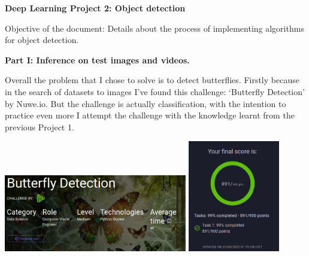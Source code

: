 \documentclass{cpsc202}
\begin{document}
    \centerline{\Large\textbf{Deep Learning Project 2: Object detection}}

    Objective of the document: Details about the process of implementing algorithms for object detection.

    \large\textbf{Part I: Inference on test images and videos.}

    Overall the problem that I chose to solve is to detect butterflies.
    Firstly because in the search of datasets to images I've found this challenge: `Butterfly Detection' by Nuwe.io.
    But the challenge is actually classification, with the intention to practice even more I attempt the challenge with the knowledge learnt from the previous Project 1.
    \begin{center}
    \includegraphics[width=0.6\textwidth]{challenge_butterfly_classification}
    \includegraphics[width=0.3\textwidth]{challenge_result}
    \end{center}
\end{document}

